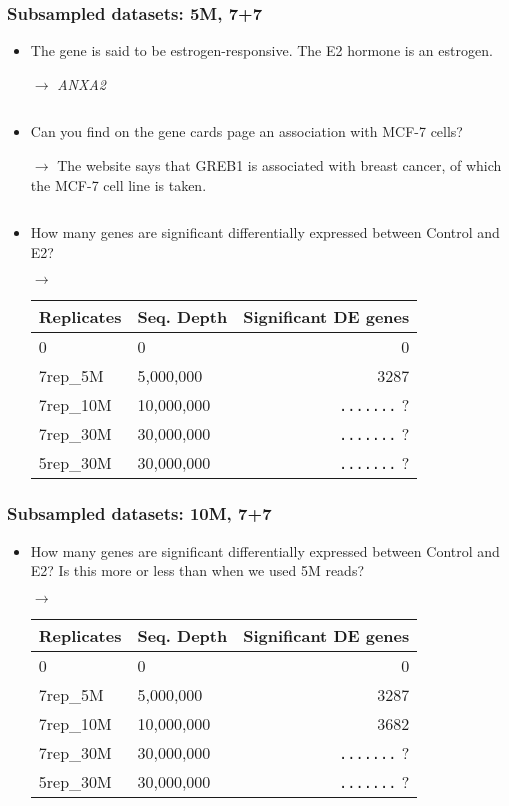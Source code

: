 \subsubsection{Subsampled datasets: 5M, 7+7}
\begin{itemize}
	\item The gene is said to be estrogen-responsive. The E2 hormone is an estrogen.
	\item[$\rightarrow$] \textit{ANXA2}
	\item[$$]
	\item Can you find on the gene cards page an association with MCF-7 cells?
	\item[$\rightarrow$] The website says that GREB1 is associated with breast cancer, of which the MCF-7 cell line is taken.
	\item[$$]
	\item How many genes are significant differentially expressed between Control and E2?
	\item[$\rightarrow$] \begin{tabular}{ | l | l | r | }
	\hline
	Replicates & Seq. Depth & Significant DE genes \\
	\hline
	0          & 0          & 0\quad\quad \\
	7rep\_5M   & 5,000,000  & 3287\quad\quad \\
	7rep\_10M  & 10,000,000 & \verb|.......| ? \\
	7rep\_30M  & 30,000,000 & \verb|.......| ? \\
	5rep\_30M  & 30,000,000 & \verb|.......| ? \\
	\hline
	\end{tabular}
\end{itemize}

\subsubsection{Subsampled datasets: 10M, 7+7}
\begin{itemize}
	\item How many genes are significant differentially expressed between Control and E2? Is this more or less than when we used 5M reads?
	\item[$\rightarrow$] \begin{tabular}{ | l | l | r | }
	\hline
	Replicates & Seq. Depth & Significant DE genes \\
	\hline
	0          & 0          & 0\quad\quad \\
	7rep\_5M   & 5,000,000  & 3287\quad\quad \\
	7rep\_10M  & 10,000,000 & 3682\quad\quad \\
	7rep\_30M  & 30,000,000 & \verb|.......| ? \\
	5rep\_30M  & 30,000,000 & \verb|.......| ? \\
	\hline
	\end{tabular}
\end{itemize}

